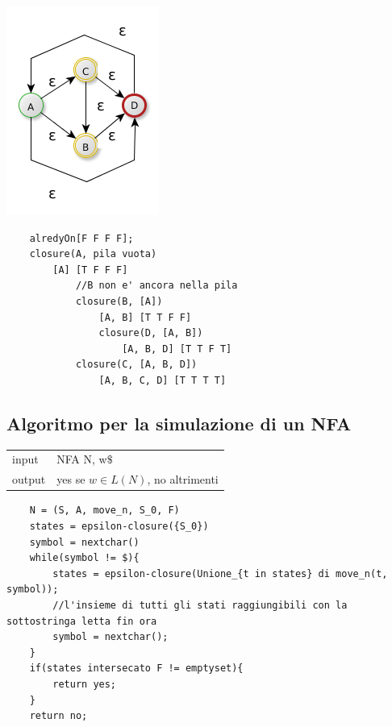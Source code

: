 \begin{center}
	\includegraphics[scale=0.5]{Chapters/Img/c02_02.png}\\
\end{center} 

\begin{lstlisting}
    alredyOn[F F F F];
    closure(A, pila vuota)
        [A] [T F F F]
            //B non e' ancora nella pila
            closure(B, [A])
                [A, B] [T T F F]
                closure(D, [A, B])
                    [A, B, D] [T T F T]
            closure(C, [A, B, D])
                [A, B, C, D] [T T T T]
\end{lstlisting}

\subsection{Algoritmo per la simulazione di un NFA}
\begin{center}
    \begin{tabular}{ll}
        input & NFA N, w$\$$\\
        output & yes se $w \in L(N)$, no altrimenti\\ 
    \end{tabular}
\end{center}
\begin{lstlisting}
    N = (S, A, move_n, S_0, F)
    states = epsilon-closure({S_0})
    symbol = nextchar()
    while(symbol != $){
        states = epsilon-closure(Unione_{t in states} di move_n(t, symbol));
        //l'insieme di tutti gli stati raggiungibili con la sottostringa letta fin ora
        symbol = nextchar();
    }
    if(states intersecato F != emptyset){
        return yes;
    }
    return no;
\end{lstlisting}

